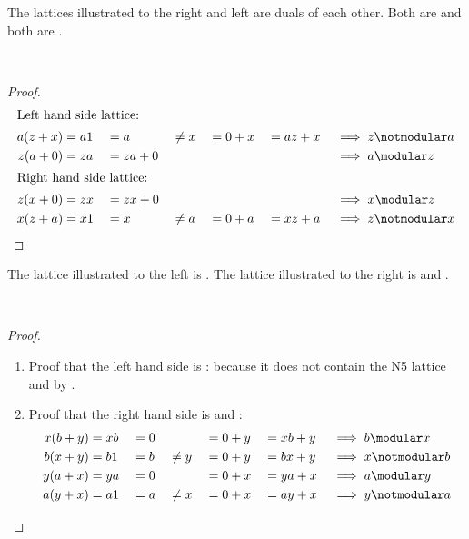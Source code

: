 \hfill%
\begin{minipage}{\tw-67mm}%
\begin{example}
\label{ex:latm_6_diadic}
The lattices illustrated to the right and left are duals of each other.
Both are  and both are .
\end{example}
\end{minipage}%
\hfill{}\\
\begin{proof}
\begin{align*}
  \intertext{Left  hand side lattice:}
    a(z+x) &= a1 &&= a    &&\ne  x &&= 0+x &&= az + x &&\implies z \notmodular a \\
    z(a+0) &= za &&= za+0 &&        &&      &&         &&\implies a \modular z \\    
  \intertext{Right hand side lattice:}
    z(x+0) &= zx &&= zx+0 &&        &&      &&         &&\implies x \modular z \\
    x(z+a) &= x1 &&= x    &&\ne  a &&= 0+a &&= xz+a   &&\implies z \notmodular x
\end{align*}
\end{proof}

\hfill%
\begin{minipage}{\tw-66mm}%
\begin{example}
\label{ex:latm_6_hexagon}
The lattice illustrated to the left is .
The lattice illustrated to the right is 
and .
\end{example}
\end{minipage}%
\hfill{}\\%
\begin{proof}
\begin{enumerate}
  \item Proof that the left hand side is : 
        because it does not contain the N5 lattice and by .

  \item Proof that the right hand side is  and :
    \begin{align*}
      x(b+y) &= xb &&= 0    &&        &&= 0+y &&= xb+y &&\implies b\modular    x \\
      b(x+y) &= b1 &&= b    &&\ne  y &&= 0+y &&= bx+y &&\implies x\notmodular b \\
      y(a+x) &= ya &&= 0    &&        &&= 0+x &&= ya+x &&\implies a\modular    y \\
      a(y+x) &= a1 &&= a    &&\ne  x &&= 0+x &&= ay+x &&\implies y\notmodular a 
    \end{align*}
\end{enumerate}
\end{proof}


